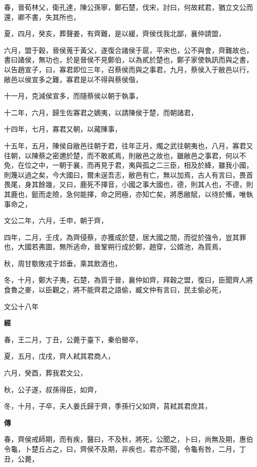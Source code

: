 \documentclass{ctexart}
\begin{document}
春，晉荀林父，衛孔達，陳公孫寧，鄭石楚，伐宋，討曰，何故弒君，猶立文公而還，卿不書，失其所也，

夏，四月，癸亥，葬聲姜，有齊難，是以緩，齊侯伐我北鄙，襄仲請盟，

六月，盟于穀，晉侯蒐于黃父，遂復合諸侯于扈，平宋也，公不與會，齊難故也，書曰諸侯，無功也，於是晉侯不見鄭伯，以為貳於楚也，鄭子家使執訊而與之書，以告趙宣子，曰，寡君即位三年，召蔡侯而與之事君，九月，蔡侯入于敝邑以行，敝邑以侯宣多之難，寡君是以不得與蔡侯偕，

十一月，克減侯宣多，而隨蔡侯以朝于執事，

十二年，六月，歸生佐寡君之嫡夷，以請陳侯于楚，而朝諸君，

十四年，七月，寡君又朝，以蕆陳事，

十五年，五月，陳侯自敝邑往朝于君，往年正月，燭之武往朝夷也，八月，寡君又往朝，以陳蔡之密邇於楚，而不敢貳焉，則敝邑之故也，雖敝邑之事君，何以不免，在位之中，一朝于襄，而再見于君，夷與孤之二三臣，相及於絳，雖我小國，則篾以過之矣，今大國曰，爾未逞吾志，敝邑有亡，無以加焉，古人有言曰，畏首畏尾，身其餘幾，又曰，鹿死不擇音，小國之事大國也，德，則其人也，不德，則其鹿也，鋌而走險，急何能擇，命之罔極，亦知亡矣，將悉敝賦，以待於鯈，唯執事命之，

文公二年，六月，壬申，朝于齊，

四年，二月，壬戌，為齊侵蔡，亦獲成於楚，居大國之間，而從於強令，豈其罪也，大國若弗圖，無所逃命，晉鞏朔行成於鄭，趙穿，公婿池，為質焉，

秋，周甘歜敗戎于邥垂，乘其飲酒也，

冬，十月，鄭大子夷，石楚，為質于晉，襄仲如齊，拜穀之盟，復曰，臣聞齊人將食魯之麥，以臣觀之，將不能齊君之語偷，臧文仲有言曰，民主偷必死，





文公十八年


\textbf{經}



春，王二月，丁丑，公薨于臺下，秦伯罃卒，

夏，五月，戊戌，齊人弒其君商人，

六月，癸酉，葬我君文公，

秋，公子遂，叔孫得臣，如齊，

冬，十月，子卒，夫人姜氏歸于齊，季孫行父如齊，莒弒其君庶其，

\textbf{傳}



春，齊侯戒師期，而有疾，醫曰，不及秋，將死，公聞之，卜曰，尚無及期，惠伯令龜，卜楚丘占之，曰，齊侯不及期，非疾也，君亦不聞，令龜有咎，二月，丁丑，公薨，
\end{document}
